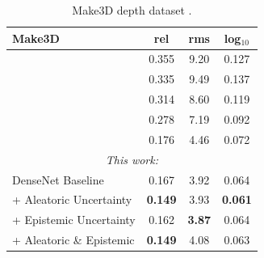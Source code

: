 \begin{table}[p]
\begin{subtable}[b]{\textwidth}
\centering
\begin{tabular}{l|c|c|c}%
    \toprule
\textbf{Make3D} & rel & rms & log$_{10}$ \\ 
    \midrule
\citet{karsch2012depth} & 0.355 & 9.20 & 0.127 \\ %
\citet{liu2014discrete} & 0.335 & 9.49 & 0.137 \\ %
\citep{liu2015deep} & 0.314 & 8.60 & 0.119 \\ %
\citet{li2015depth} & 0.278 & 7.19 & 0.092 \\ %
\citet{laina2016deeper} & 0.176 &  4.46 & 0.072 \\ 
    \midrule
\multicolumn{4}{c}{\textit{This work:}} \\ 
    \midrule
DenseNet Baseline & 0.167 & 3.92 & 0.064 \\ %
+ Aleatoric Uncertainty & \textbf{0.149} & 3.93 & \textbf{0.061} \\ %
+ Epistemic Uncertainty & 0.162 & \textbf{3.87} & 0.064 \\ %
+ Aleatoric \& Epistemic & \textbf{0.149} & 4.08 & 0.063 \\ %
    \bottomrule
\end{tabular}
\caption{Make3D depth dataset \citep{saxena2009make3d}.}
\label{make3d}
\end{subtable}



\end{table}
